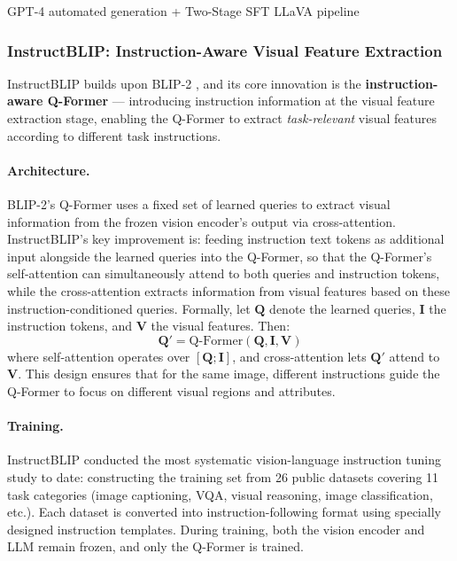   {GPT-4 automated generation + Two-Stage SFT}
  {LLaVA pipeline}

\subsubsection{InstructBLIP: Instruction-Aware Visual Feature Extraction}
\label{sec:t5-instructblip}

InstructBLIP \cite{dai2023instructblip} builds upon BLIP-2 \cite{li2023blip2},
and its core innovation is the \textbf{instruction-aware Q-Former} ---
introducing instruction information at the visual feature extraction stage,
enabling the Q-Former to extract \textit{task-relevant} visual features according to different task instructions.

\paragraph{Architecture.}
BLIP-2's Q-Former uses a fixed set of learned queries
to extract visual information from the frozen vision encoder's output via cross-attention.
InstructBLIP's key improvement is:
feeding instruction text tokens as additional input alongside the learned queries into the Q-Former,
so that the Q-Former's self-attention can simultaneously attend to both queries and instruction tokens,
while the cross-attention extracts information from visual features based on these instruction-conditioned queries.
Formally, let $\mathbf{Q}$ denote the learned queries, $\mathbf{I}$ the instruction tokens,
and $\mathbf{V}$ the visual features. Then:
\begin{equation}
  \mathbf{Q}' = \text{Q-Former}(\mathbf{Q}, \mathbf{I}, \mathbf{V})
\end{equation}
where self-attention operates over $[\mathbf{Q}; \mathbf{I}]$,
and cross-attention lets $\mathbf{Q}'$ attend to $\mathbf{V}$.
This design ensures that for the same image, different instructions guide the Q-Former to focus on different visual regions and attributes.

\paragraph{Training.}
InstructBLIP conducted the most systematic vision-language instruction tuning study to date:
constructing the training set from 26 public datasets covering 11 task categories
(image captioning, VQA, visual reasoning, image classification, etc.).
Each dataset is converted into instruction-following format using specially designed instruction templates.
During training, both the vision encoder and LLM remain frozen, and only the Q-Former is trained.

